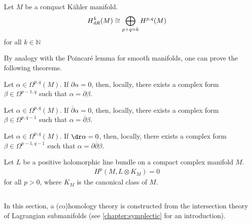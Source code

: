     \begin{theorem}
        Let $M$ be a compact K\"ahler manifold.
        \begin{gather}
            H^k_{\emph{dR}}(M)\cong\bigoplus_{p+q=k}H^{p,q}(M)
        \end{gather}
        for all $k\in\mathbb{N}$
    \end{theorem}

    By analogy with the Poincar\'e lemma for smooth manifolds, one can prove the following theorems.
    \begin{theorem}
        Let $\alpha\in\Omega^{p,q}(M)$. If $\partial\alpha = 0$, then, locally, there exists a complex form $\beta\in\Omega^{p-1,q}$ such that $\alpha = \partial\beta$.
    \end{theorem}
    \begin{theorem}
        Let $\alpha\in\Omega^{p,q}(M)$. If $\overline{\partial}\alpha = 0$, then, locally, there exists a complex form $\beta\in\Omega^{p,q-1}$ such that $\alpha = \overline{\partial}\beta$.
    \end{theorem}
    \begin{theorem}\label{complex:del_delbar_lemma}
        Let $\alpha\in\Omega^{p,q}(M)$. If $\dr\alpha = 0$, then, locally, there exists a complex form $\beta\in\Omega^{p-1,q-1}$ such that $\alpha = \partial\overline{\partial}\beta$.
    \end{theorem}

    \begin{theorem}\label{complex:kodiara_vanishing}
        Let $L$ be a positive holomorphic line bundle on a compact complex manifold $M$.
        \begin{gather}
            H^p(M,L\otimes K_M) = 0
        \end{gather}
        for all $p>0$, where $K_M$ is the canonical class of $M$.
    \end{theorem}

\subsection{}

    In this section, a (co)homology theory is constructed from the intersection theory of Lagrangian submanifolds (see \cref{chapter:symplectic} for an introduction).

